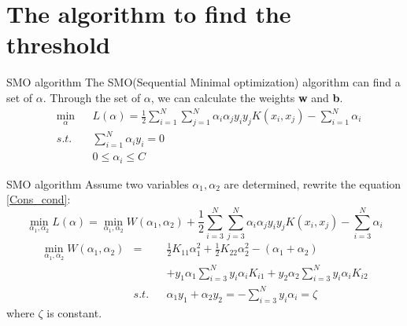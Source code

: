 \documentclass[10pt]{beamer}
\begin{document}
\section{The algorithm to find the threshold}


\begin{frame}{SMO algorithm}
The SMO(Sequential Minimal optimization) algorithm can find a set of $\alpha$.
Through the set of $ \alpha $, we can calculate the weights \textbf{w} and \textbf{b}.
\begin{equation}
    \begin{aligned}
   & \underset{\alpha}{\min}&&L(\alpha)=\frac{1}{2}\sum_{i=1}^{N}\sum_{j=1}^{N}
    \alpha_i\alpha_jy_iy_jK(x_i,x_j)-\sum_{i=1}^{N}\alpha_i \\
   & s.t. &&\sum_{i=1}^{N}\alpha_iy_i=0 \\
   & && 0 \leq\alpha_i\leq C 
    \end{aligned}
    \label{Cons_cond}
\end{equation}
\end{frame}
\begin{frame}{SMO algorithm}
Assume two variables $\alpha_1,\alpha_2$ are determined, rewrite the equation \ref{Cons_cond}:
\begin{equation}
    \underset{\alpha_1,\alpha_2}{\min}  L(\alpha)= \underset{\alpha_1,\alpha_2}{\min}W(\alpha_1,\alpha_2)
    +\frac{1}{2}\sum_{i=3}^{N}\sum_{j=3}^{N}\alpha_i\alpha_jy_iy_jK(x_i,x_j)-\sum_{i=3}^{N}\alpha_i
\end{equation}
\begin{equation}
    \begin{aligned}
    \underset{\alpha_1,\alpha_2}{\min}W(\alpha_1,\alpha_2)
   &=&&\frac{1}{2}K_{11}\alpha_1^2+\frac{1}{2}K_{22}\alpha_2^2-(\alpha_1+\alpha_2) \\
   & &&+y_1\alpha_1\sum_{i=3}^{N}y_i\alpha_iK_{i1}+y_2\alpha_2\sum_{i=3}^Ny_i\alpha_iK_{i2} \\
   &s.t.&&\alpha_1y_1+\alpha_2y_2 = -\sum_{i=3}^Ny_i\alpha_i = \zeta
    \end{aligned}
    \label{SMO_cond}
\end{equation}
where $\zeta$ is constant.
\end{frame}
\end{document}
